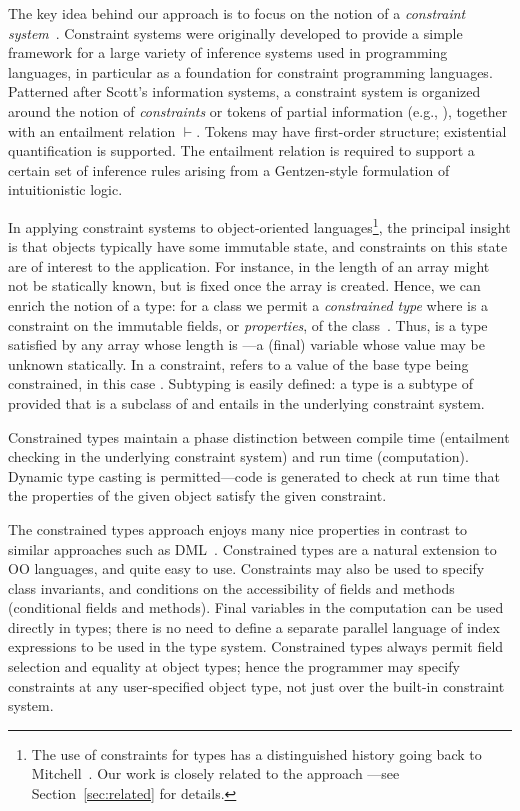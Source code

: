 The key idea behind our approach is to focus on the notion of a
\emph{constraint system}~\cite{cccc}. Constraint systems were originally developed
to provide a simple framework for a large variety of
inference systems used in programming languages, in particular as a
foundation for constraint programming languages.  Patterned after
Scott's information systems, a constraint system is
organized around the notion of \emph{constraints} or tokens of partial
information (e.g., ), together with an entailment
relation $\vdash$.  Tokens may have first-order structure; existential
quantification is supported. The entailment relation is required to
support a certain set of inference rules arising from a Gentzen-style
formulation of intuitionistic logic.

In applying constraint systems to object-oriented
languages\footnote{The use of constraints for types has a
distinguished history going back to Mitchell~\cite{mitchell84}.
Our work is closely related to the \hmx{} approach
\cite{sulzmann97type}---see Section~\ref{sec:related} for
details.}, the principal insight
is that objects typically have some immutable state, and constraints on
this state are of interest to the application.  For instance, in \Java{}
the length of an array might not be statically known, but is fixed once
the array is created. Hence, we can enrich the notion of a type: for a
class  we permit a \emph{constrained type}  where 
is a
constraint on the immutable fields, or \emph{properties}, of the
class~\cite{constrained-types}. Thus, 
 is a type satisfied by any array whose length
is ---a (final) variable whose value may be unknown
statically. In a constraint,  refers to 
a value of the base type being constrained, in this case .
Subtyping is easily defined: a type  is a
subtype of  
provided that  is a subclass of  and 
entails  in the underlying constraint system.

Constrained types maintain a phase distinction between compile time
(entailment checking in the underlying constraint system) and run time
(computation).  Dynamic type casting is permitted---code is generated
to check at run time that the properties of the given object satisfy
the given constraint.

The constrained types approach enjoys many nice properties in contrast
to similar approaches such as DML~\cite{xi99dependent}.  Constrained
types are a natural extension to OO languages, and quite easy to
use. Constraints may also be used to specify class invariants, and
conditions on the accessibility of fields and methods (conditional
fields and methods).  Final variables in the computation can be used
directly in types; there is no need to define a separate
parallel language of index expressions to be used in the type system.
Constrained types always
permit field selection and equality at object types; hence the
programmer may specify constraints at any user-specified object type,
not just over the built-in constraint system.  

